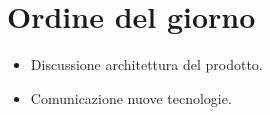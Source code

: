 \section{Ordine del giorno}

\begin{itemize}
\item Discussione architettura del prodotto.
\item Comunicazione nuove tecnologie.
\end{itemize}